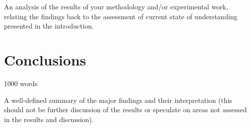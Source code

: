 \documentclass[12pt, a4paper]{article}
\begin{document}
An analysis of the results of your methodology and/or experimental work, relating the findings back to the assessment of current state of understanding presented in the introduction.






\section{Conclusions}
1000 words

A well-defined summary of the major findings and their interpretation (this should not be further discussion of the results or speculate on areas not assessed in the results and discussion).






 
\end{document}
